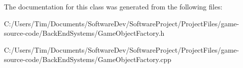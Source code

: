 The documentation for this class was generated from the following files\+:\begin{DoxyCompactItemize}
\item 
C\+:/\+Users/\+Tim/\+Documents/\+Software\+Dev/\+Software\+Project/\+Project\+Files/game-\/source-\/code/\+Back\+End\+Systems/Game\+Object\+Factory.\+h\item 
C\+:/\+Users/\+Tim/\+Documents/\+Software\+Dev/\+Software\+Project/\+Project\+Files/game-\/source-\/code/\+Back\+End\+Systems/Game\+Object\+Factory.\+cpp\end{DoxyCompactItemize}
